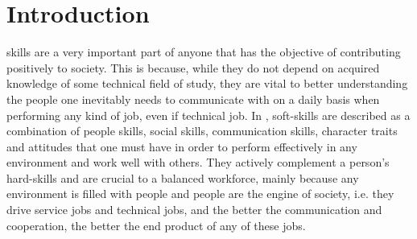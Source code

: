 \documentclass[a4paper,12pt,journal,twoside,compsoc]{PPIEEEtran}
\begin{document}


\maketitle

\IEEEdisplaynontitleabstractindextext
\IEEEpeerreviewmaketitle
\section{Introduction}
% 
% 
 skills are a very important part of anyone that has the objective of contributing positively to society. This is because, while they do not depend on acquired knowledge of some technical field of study, they are vital to better understanding the people one inevitably needs to communicate with on a daily basis when performing any kind of job, even if technical job. In \cite{workforce}, soft-skills are described as a combination of people skills, social skills, communication skills, character traits and attitudes that one must have in order to perform effectively in any environment and work well with others. They actively complement a person's hard-skills and are crucial to a balanced workforce, mainly because any environment is filled with people and people are the engine of society, i.e. they drive service jobs and technical jobs, and the better the communication and cooperation, the better the end product of any of these jobs.
\end{document}
